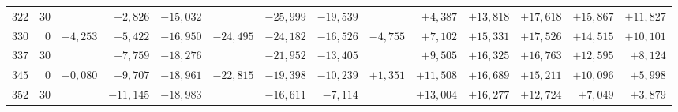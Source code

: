 \begin{landscape}
\begin{longtable}{@{}rr|r|r|r|r|r|r|r|r|r|r|r|r@{}}
\(322\) & \(30\) &  & \(-2{,}826\) & \(-15{,}032\) &  & \(-25{,}999\) & \(-19{,}539\) &  & \(+4{,}387\) & \(+13{,}818\) & \(+17{,}618\) & \(+15{,}867\) & \(+11{,}827\)\\[2pt]
\(330\) & \(0\) & \(+4{,}253\) & \(-5{,}422\) & \(-16{,}950\) & \(-24{,}495\) & \(-24{,}182\) & \(-16{,}526\) & \(-4{,}755\) & \(+7{,}102\) & \(+15{,}331\) & \(+17{,}526\) & \(+14{,}515\) & \(+10{,}101\)\\
\(337\) & \(30\) &  & \(-7{,}759\) & \(-18{,}276\) &  & \(-21{,}952\) & \(-13{,}405\) &  & \(+9{,}505\) & \(+16{,}325\) & \(+16{,}763\) & \(+12{,}595\) & \(+8{,}124\)\\
\(345\) & \(0\) & \(-0{,}080\) & \(-9{,}707\) & \(-18{,}961\) & \(-22{,}815\) & \(-19{,}398\) & \(-10{,}239\) & \(+1{,}351\) & \(+11{,}508\) & \(+16{,}689\) & \(+15{,}211\) & \(+10{,}096\) & \(+5{,}998\)\\
\(352\) & \(30\) &  & \(-11{,}145\) & \(-18{,}983\) &  & \(-16{,}611\) & \(-7{,}114\) &  & \(+13{,}004\) & \(+16{,}277\) & \(+12{,}724\) & \(+7{,}049\) & \(+3{,}879\)\\
\end{longtable}
\clearpage
\endgroup
\end{landscape}
\clearpage
